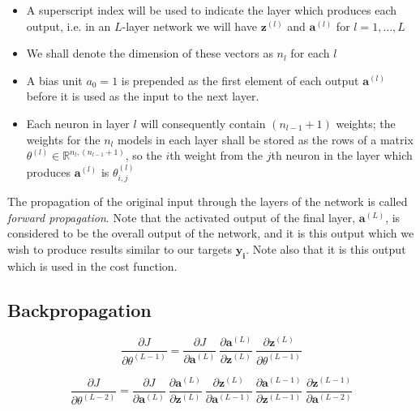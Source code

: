 \documentclass{article}[11pt]
\begin{document}
        \begin{itemize}
            
            \item A superscript index will be used to indicate the layer which produces each output, i.e. in an $L$-layer network we will have $\mathbf{z}^{(l)}$ and $\mathbf{a}^{(l)}$ for $l = 1, \ldots, L$
            
            \item We shall denote the dimension of these vectors as $n_l$ for each $l$
            
            \item A bias unit $a_0 = 1$ is prepended as the first element of each output $\mathbf{a}^{(l)}$ before it is used as the input to the next layer.
            
            \item Each neuron in layer $l$ will consequently contain $(n_{l-1} + 1)$ weights; the weights for the $n_l$ models in each layer shall be stored as the rows of a matrix $\theta^{(l)} \in \mathbb{R}^{n_l, (n_{l-1}+1)}$, so the $i$th weight from the $j$th neuron in the layer which produces $\mathbf{a}^{(l)}$ is $\theta^{(l)}_{i,j}$
        
        \end{itemize}
        
        The propagation of the original input through the layers of the network is called \textit{forward propagation}. Note that the activated output of the final layer, $\mathbf{a}^{(L)}$, is considered to be the overall output of the network, and it is this output which we wish to produce results similar to our targets $\mathbf{y_i}$. Note also that it is this output which is used in the cost function.
        
        
        

    \subsection{Backpropagation}
        
        
        $$
        \frac{\partial J}{\partial \theta^{(L-1)}} =
            \frac{\partial J}{\partial \mathbf{a}^{(L)}} \
            \frac{\partial \mathbf{a}^{(L)}}{\partial \mathbf{z}^{(L)}} \
            \frac{\partial \mathbf{z}^{(L)}}{\partial \theta^{(L-1)}}
        $$



        $$
        \frac{\partial J}{\partial \theta^{(L-2)}} =
            \frac{\partial J}{\partial \mathbf{a}^{(L)}} \
            \frac{\partial \mathbf{a}^{(L)}}{\partial \mathbf{z}^{(L)}} \
            \frac{\partial \mathbf{z}^{(L)}}{\partial \mathbf{a}^{(L-1)}} \
            \frac{\partial \mathbf{a}^{(L-1)}}{\partial \mathbf{z}^{(L-1)}} \
            \frac{\partial \mathbf{z}^{(L-1)}}{\partial \mathbf{a}^{(L-2)}}
        $$
\end{document}
